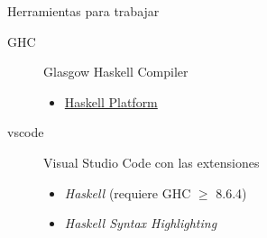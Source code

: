 \begin{frame}{Herramientas para trabajar}
    \begin{description}
        \item[GHC] Glasgow Haskell Compiler
        \begin{itemize}
            \item \href{https://www.haskell.org/downloads/}{Haskell Platform}
        \end{itemize} 
        \item[vscode] Visual Studio Code con las extensiones
        \begin{itemize}
            \item \emph{Haskell} (requiere GHC $\geqslant$ 8.6.4)
            \item \emph{Haskell Syntax Highlighting}
        \end{itemize}
    \end{description}
\end{frame}

